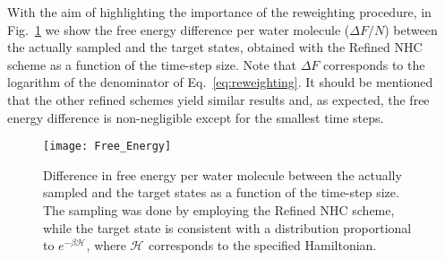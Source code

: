 \documentclass[
	aip,
	jcp,
	reprint,
]{revtex4-1}
\newcommand{\Ham}[1]{{\mathcal H}_\text{#1}}           %
\begin{document}
With the aim of highlighting the importance of the reweighting procedure, in Fig.~\ref{fig:free_energy} we show the free energy difference per water molecule ($\Delta F/N$) between the actually sampled and the target states, obtained with the Refined NHC scheme as a function of the time-step size.
Note that $\Delta F$ corresponds to the logarithm of the denominator of Eq.~\eqref{eq:reweighting}.
It should be mentioned that the other refined schemes yield similar results and, as expected, the free energy difference is non-negligible except for the smallest time steps.

\begin{figure}
	\texttt{[image: Free\_Energy]}
	\caption{Difference in free energy per water molecule between the actually sampled and the target states as a function of the time-step size. The sampling was done by employing the Refined NHC scheme, while the target state is consistent with a distribution proportional to $e^{-\beta \Ham{}}$, where $\Ham{}$ corresponds to the specified Hamiltonian.}
	\label{fig:free_energy}
\end{figure}
\end{document}
